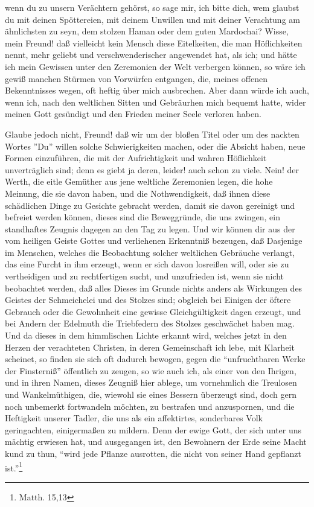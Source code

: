 wenn du zu unsern Verächtern gehörst, so sage mir, ich bitte dich, wem glaubst
du mit deinen Spöttereien, mit deinem Unwillen und mit deiner Verachtung am
ähnlichsten zu seyn, dem stolzen Haman oder dem guten Mardochai? Wisse, mein
Freund! daß vielleicht kein Mensch diese Eitelkeiten, die man Höflichkeiten
nennt, mehr geliebt und verschwenderischer angewendet hat, als ich; und hätte
ich mein Gewissen unter den Zeremonien der Welt verbergen können, so wäre ich
gewiß manchen Stürmen von Vorwürfen entgangen, die, meines offenen Bekenntnisses
wegen, oft heftig über mich ausbrechen. Aber dann würde ich auch, wenn ich, nach
den weltlichen Sitten und Gebräurhen mich bequemt hatte, wider meinen Gott
gesündigt und den Frieden meiner Seele verloren haben.

Glaube jedoch nicht, Freund! daß wir um der bloßen Titel oder um des nackten
Wortes ''Du'' willen solche Schwierigkeiten machen, oder die Absicht haben, neue
Formen einzuführen, die mit der Aufrichtigkeit und wahren Höflichkeit
unverträglich sind; denn es giebt ja deren, leider! auch schon zu viele. Nein!
der Werth, die eitle Gemüther aus jene weltliche Zeremonien legen, die hohe
Meinung, die sie davon haben, und die Nothwendigkeit, daß ihnen diese
schädlichen Dinge zu Gesichte gebracht werden, damit sie davon gereinigt und
befreiet werden  können, dieses sind die Beweggründe, die uns zwingen, ein
standhaftes Zeugnis dagegen an den Tag zu legen. Und wir können dir aus der vom
heiligen Geiste Gottes und verliehenen Erkenntniß bezeugen, daß Dasjenige im
Menschen, welches die Beobachtung solcher weltlichen Gebräuche verlangt, das
eine Furcht in ihm erzeugt, wenn er sich davon losreißen will, oder sie zu
vertheidigen und zu rechtfertigen sucht, und unzufrieden ist, wenn sie nicht
beobachtet werden, daß alles Dieses im Grunde nichts anders als Wirkungen des
Geistes der Schmeichelei und des Stolzes sind; obgleich bei Einigen der öftere
Gebrauch oder die Gewohnheit eine gewisse Gleichgültigkeit dagen erzeugt, und
bei Andern der Edelmuth die Triebfedern des Stolzes geschwächet haben mag. Und
da dieses in dem himmlischen Lichte erkannt wird, welches jetzt in den Herzen
der verachteten Christen, in deren Gemeinschaft ich lebe, mit Klarheit scheinet,
so finden sie sich oft dadurch bewogen, gegen die "`unfruchtbaren Werke der
Finsterniß"' öffentlich zu zeugen, so wie auch ich, als einer von den Ihrigen,
und in ihren Namen, dieses Zeugniß hier ablege, um vornehmlich die Treulosen und
Wankelmüthigen, die, wiewohl sie eines Bessern überzeugt sind, doch gern noch
unbemerkt fortwandeln möchten, zu bestrafen und anzuspornen, und die Heftigkeit
unserer Tadler, die uns als ein affektirtes, sonderbares Volk geringachten,
einigermaßen zu mildern. Denn der ewige Gott, der sich unter uns mächtig
erwiesen hat, und ausgegangen ist, den Bewohnern der Erde seine Macht kund zu
thun, "`wird jede Pflanze ausrotten, die nicht von seiner Hand gepflanzt
ist."'\footnote{Matth. 15,13}


